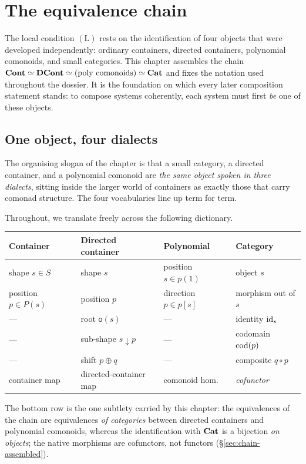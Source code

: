 \chapter{The equivalence chain}
\label{ch:eqchain}
The local condition $(\mathrm{L})$ rests on the identification of four objects
that were developed independently: ordinary containers, directed containers,
polynomial comonoids, and small categories. This chapter assembles the chain
$\mathbf{Cont}\simeq\mathbf{DCont}\simeq(\text{poly comonoids})\simeq\mathbf{Cat}$ and fixes the
notation used throughout the dossier. It is the foundation on which every later
composition statement stands: to compose systems coherently, each system must
first \emph{be} one of these objects.

\section{One object, four dialects}\label{sec:chain-dialects}

The organising slogan of the chapter is that a small category, a directed
container, and a polynomial comonoid are \emph{the same object spoken in three
dialects}, sitting inside the larger world of containers as exactly those that
carry comonad structure. The four vocabularies line up term for term.

\begin{notation}\label{not:chain-dialects}
Throughout, we translate freely across the following dictionary.
\begin{center}
\begin{tabular}{@{}llll@{}}
\toprule
\textbf{Container} & \textbf{Directed container} & \textbf{Polynomial} & \textbf{Category}\\
\midrule
shape $s\in S$ & shape $s$ & position $s\in p(1)$ & object $s$\\
position $p\in P(s)$ & position $p$ & direction $p\in p[s]$ & morphism out of $s$\\
--- & root $\mathsf o(s)$ & --- & identity $\mathrm{id}_s$\\
--- & sub-shape $s\downarrow p$ & --- & codomain $\operatorname{cod}(p)$\\
--- & shift $p\oplus q$ & --- & composite $q\circ p$\\
container map & directed-container map & comonoid hom. & \emph{cofunctor}\\
\bottomrule
\end{tabular}
\end{center}
The bottom row is the one subtlety carried by this chapter: the equivalences of
the chain are equivalences \emph{of categories} between directed containers and
polynomial comonoids, whereas the identification with $\mathbf{Cat}$ is a bijection
\emph{on objects}; the native morphisms are cofunctors, not functors
(\S\ref{sec:chain-assembled}).
\end{notation}

